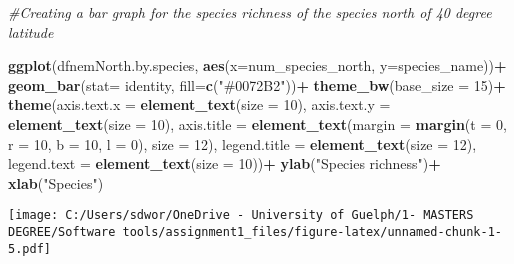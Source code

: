 \documentclass[
]{article}
\newenvironment{Shaded}{\begin{snugshade}}{\end{snugshade}}
\newcommand{\AttributeTok}[1]{\textcolor[rgb]{0.13,0.29,0.53}{#1}}
\newcommand{\CommentTok}[1]{\textcolor[rgb]{0.56,0.35,0.01}{\textit{#1}}}
\newcommand{\DecValTok}[1]{\textcolor[rgb]{0.00,0.00,0.81}{#1}}
\newcommand{\FunctionTok}[1]{\textcolor[rgb]{0.13,0.29,0.53}{\textbf{#1}}}
\newcommand{\NormalTok}[1]{#1}
\newcommand{\SpecialCharTok}[1]{\textcolor[rgb]{0.81,0.36,0.00}{\textbf{#1}}}
\newcommand{\StringTok}[1]{\textcolor[rgb]{0.31,0.60,0.02}{#1}}
\begin{document}
\begin{Shaded}
\begin{Highlighting}[]
\CommentTok{\#Creating a bar graph for the species richness of the species north of 40 degree latitude }

\FunctionTok{ggplot}\NormalTok{(dfnemNorth.by.species, }\FunctionTok{aes}\NormalTok{(}\AttributeTok{x=}\NormalTok{num\_species\_north, }\AttributeTok{y=}\NormalTok{species\_name))}\SpecialCharTok{+}
  \FunctionTok{geom\_bar}\NormalTok{(}\AttributeTok{stat=} \StringTok{\textquotesingle{}identity\textquotesingle{}}\NormalTok{, }\AttributeTok{fill=}\FunctionTok{c}\NormalTok{(}\StringTok{"\#0072B2"}\NormalTok{))}\SpecialCharTok{+}
  \FunctionTok{theme\_bw}\NormalTok{(}\AttributeTok{base\_size =} \DecValTok{15}\NormalTok{)}\SpecialCharTok{+}
  \FunctionTok{theme}\NormalTok{(}\AttributeTok{axis.text.x =} \FunctionTok{element\_text}\NormalTok{(}\AttributeTok{size =} \DecValTok{10}\NormalTok{), }\AttributeTok{axis.text.y =} \FunctionTok{element\_text}\NormalTok{(}\AttributeTok{size =} \DecValTok{10}\NormalTok{), }\AttributeTok{axis.title =} \FunctionTok{element\_text}\NormalTok{(}\AttributeTok{margin =} \FunctionTok{margin}\NormalTok{(}\AttributeTok{t =} \DecValTok{0}\NormalTok{, }\AttributeTok{r =} \DecValTok{10}\NormalTok{, }\AttributeTok{b =} \DecValTok{10}\NormalTok{, }\AttributeTok{l =} \DecValTok{0}\NormalTok{), }\AttributeTok{size =} \DecValTok{12}\NormalTok{), }\AttributeTok{legend.title =} \FunctionTok{element\_text}\NormalTok{(}\AttributeTok{size =} \DecValTok{12}\NormalTok{), }\AttributeTok{legend.text =} \FunctionTok{element\_text}\NormalTok{(}\AttributeTok{size =} \DecValTok{10}\NormalTok{))}\SpecialCharTok{+}
  \FunctionTok{ylab}\NormalTok{(}\StringTok{"Species richness"}\NormalTok{)}\SpecialCharTok{+}
  \FunctionTok{xlab}\NormalTok{(}\StringTok{"Species"}\NormalTok{)}
\end{Highlighting}
\end{Shaded}

\texttt{[image: C:/Users/sdwor/OneDrive - University of Guelph/1- MASTERS DEGREE/Software tools/assignment1\_files/figure-latex/unnamed-chunk-1-5.pdf]}
\end{document}
